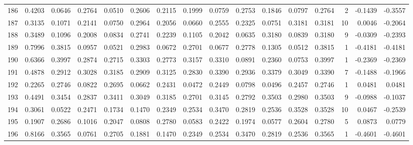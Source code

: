 \begin{tabular}{lrrrrrrrrrrrrrrr}
186 &      0.4203 &  0.0646 &  0.2764 &  0.0510 &  0.2606 &  0.2115 &  0.1999 &  0.0759 &  0.2753 &  0.1846 &   0.0797 &     0.2764 &      2 &                   -0.1439 &                    -0.3557 \\
187 &      0.3135 &  0.1071 &  0.2141 &  0.0750 &  0.2964 &  0.2056 &  0.0660 &  0.2555 &  0.2325 &  0.0751 &   0.3181 &     0.3181 &     10 &                    0.0046 &                    -0.2064 \\
188 &      0.3489 &  0.1096 &  0.2008 &  0.0834 &  0.2741 &  0.2239 &  0.1105 &  0.2042 &  0.0635 &  0.3180 &   0.0839 &     0.3180 &      9 &                   -0.0309 &                    -0.2393 \\
189 &      0.7996 &  0.3815 &  0.0957 &  0.0521 &  0.2983 &  0.0672 &  0.2701 &  0.0677 &  0.2778 &  0.1305 &   0.0512 &     0.3815 &      1 &                   -0.4181 &                    -0.4181 \\
190 &      0.6366 &  0.3997 &  0.2874 &  0.2715 &  0.3303 &  0.2773 &  0.3157 &  0.3310 &  0.0891 &  0.2360 &   0.0753 &     0.3997 &      1 &                   -0.2369 &                    -0.2369 \\
191 &      0.4878 &  0.2912 &  0.3028 &  0.3185 &  0.2909 &  0.3125 &  0.2830 &  0.3390 &  0.2936 &  0.3379 &   0.3049 &     0.3390 &      7 &                   -0.1488 &                    -0.1966 \\
192 &      0.2265 &  0.2746 &  0.0822 &  0.2695 &  0.0662 &  0.2431 &  0.0472 &  0.2449 &  0.0798 &  0.0496 &   0.2457 &     0.2746 &      1 &                    0.0481 &                     0.0481 \\
193 &      0.4491 &  0.3454 &  0.2837 &  0.3411 &  0.3049 &  0.3185 &  0.2701 &  0.3145 &  0.2792 &  0.3503 &   0.2980 &     0.3503 &      9 &                   -0.0988 &                    -0.1037 \\
194 &      0.3061 &  0.0522 &  0.2471 &  0.1734 &  0.1470 &  0.2349 &  0.2534 &  0.3470 &  0.2819 &  0.2536 &   0.3528 &     0.3528 &     10 &                    0.0467 &                    -0.2539 \\
195 &      0.1907 &  0.2686 &  0.1016 &  0.2047 &  0.0808 &  0.2780 &  0.0583 &  0.2422 &  0.1974 &  0.0577 &   0.2604 &     0.2780 &      5 &                    0.0873 &                     0.0779 \\
196 &      0.8166 &  0.3565 &  0.0761 &  0.2705 &  0.1881 &  0.1470 &  0.2349 &  0.2534 &  0.3470 &  0.2819 &   0.2536 &     0.3565 &      1 &                   -0.4601 &                    -0.4601 \\

\end{tabular}
